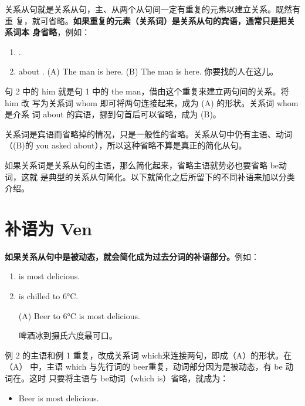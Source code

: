 关系从句就是关系从句，主、从两个从句间一定有重复的元素以建立关系。既然有重
复，就可省略。\textbf{如果重复的元素（关系词）是关系从句的宾语，通常只是把关系词本
  身省略}，例如：

\begin{enumerate}
\item {}  .
\item {}  about .
\reitem (A) The man  is here.
\reitem (B) The man  is here.
你要找的人在这儿。
\end{enumerate}
句 2 中的 him 就是句 1 中的 the man，借由这个重复来建立两句间的关系。将him 改
写为关系词 whom 即可将两句连接起来，成为 (A) 的形状。关系词 whom是介系
词 about 的宾语，挪到句首后可以省略，成为 (B)。

关系词是宾语而省略掉的情况，只是一般性的省略。关系从句中仍有主语、动词
（(B)的 you asked about），所以这种省略不算是真正的简化从句。

如果关系词是关系从句的主语，那么简化起来，省略主语就势必也要省略 be动词，这就
是典型的关系从句简化。以下就简化之后所留下的不同补语来加以分类介绍。

\section{补语为 Ven}

\textbf{如果关系从句中是被动态，就会简化成为过去分词的补语部分。}例如：
\begin{enumerate}
\item {} is most delicious.
\item {} is chilled to 6°C.

  \reitem (A) Beer  to 6°C is most delicious.

  啤酒冰到摄氏六度最可口。
\end{enumerate}
例 2 的主语和例 1 重复，改成关系词 which来连接两句，即成（A）的形状。在（A）
中，主语 which 与先行词的 beer重复，动词部分因为是被动态，有 be 动词在。这时
只要将主语与 be动词（which is）省略，就成为：
\begin{itemize}
\item Beer  is most delicious.
\end{itemize}

